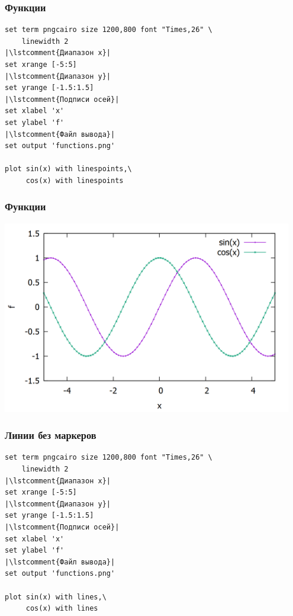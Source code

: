 \documentclass[12pt, compress]{beamer}
\newcommand{\lstcomment}[1]{\textcolor{dark-green}{\# \texttt{#1}}}
\begin{document}
\begin{frame}[c,fragile]
\frametitle{Функции}
\begin{lstlisting}
set term pngcairo size 1200,800 font "Times,26" \
    linewidth 2
|\lstcomment{Диапазон x}|
set xrange [-5:5]
|\lstcomment{Диапазон y}|
set yrange [-1.5:1.5]
|\lstcomment{Подписи осей}|
set xlabel 'x'
set ylabel 'f'
|\lstcomment{Файл вывода}|
set output 'functions.png'

plot sin(x) with linespoints,\
     cos(x) with linespoints
\end{lstlisting}
\end{frame}


\begin{frame}[c,fragile]
\frametitle{Функции}
\includegraphics[width=0.95\textwidth]{./gp/functions1.png}
\end{frame}

\begin{frame}[c,fragile]
\frametitle{Линии без маркеров}
\begin{lstlisting}
set term pngcairo size 1200,800 font "Times,26" \
    linewidth 2
|\lstcomment{Диапазон x}|
set xrange [-5:5]
|\lstcomment{Диапазон y}|
set yrange [-1.5:1.5]
|\lstcomment{Подписи осей}|
set xlabel 'x'
set ylabel 'f'
|\lstcomment{Файл вывода}|
set output 'functions.png'

plot sin(x) with lines,\
     cos(x) with lines
\end{lstlisting}
\end{frame}
\end{document}
